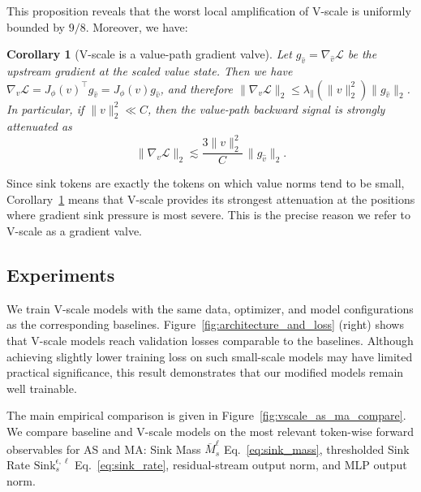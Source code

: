 \documentclass{article}
\theoremstyle{plain}
\newtheorem{corollary}{Corollary}
\theoremstyle{definition}
\theoremstyle{remark}
\begin{document}
This proposition reveals that the worst local amplification of V-scale is uniformly bounded by $9/8$.
Moreover, we have:

\begin{corollary}[V-scale is a value-path gradient valve]\label{cor:vscale_main}
Let $g_{\hat v}=\nabla_{\hat v}\mathcal{L}$ be the upstream gradient at the scaled value state.
Then we have $\nabla_v \mathcal{L} = J_{\phi}(v)^\top g_{\hat v} = J_{\phi}(v) g_{\hat v}$,
and therefore $\|\nabla_v \mathcal{L}\|_2 \le \lambda_\parallel(\|v\|_2^2)\|g_{\hat v}\|_2$.
In particular, if $\|v\|_2^2\ll C$, then the value-path backward signal is strongly attenuated as
\[
\|\nabla_v \mathcal{L}\|_2
\lesssim
\frac{3\|v\|_2^2}{C}
\,\|g_{\hat v}\|_2.
\]
\end{corollary}

Since sink tokens are exactly the tokens on which value norms tend to be small, Corollary~\ref{cor:vscale_main} means that V-scale provides its strongest attenuation at the positions where gradient sink pressure is most severe. This is the precise reason we refer to V-scale as a gradient valve.

\subsection{Experiments}
We train V-scale models with the same data, optimizer, and model configurations as the corresponding baselines.
Figure~\ref{fig:architecture_and_loss} (right) shows that V-scale models reach validation losses comparable to the baselines. 
Although achieving slightly lower training loss on such small-scale models may have limited practical significance, this result demonstrates that our modified models remain well trainable. 

The main empirical comparison is given in Figure~\ref{fig:vscale_as_ma_compare}. We compare baseline and V-scale models on the most relevant token-wise forward observables for AS and MA: Sink Mass $\overline M_s^\ell$ Eq.~\eqref{eq:sink_mass}, thresholded Sink Rate $\mathrm{Sink}_s^{\epsilon,\ell}$ Eq.~\eqref{eq:sink_rate}, residual-stream output norm, and MLP output norm.
\end{document}
